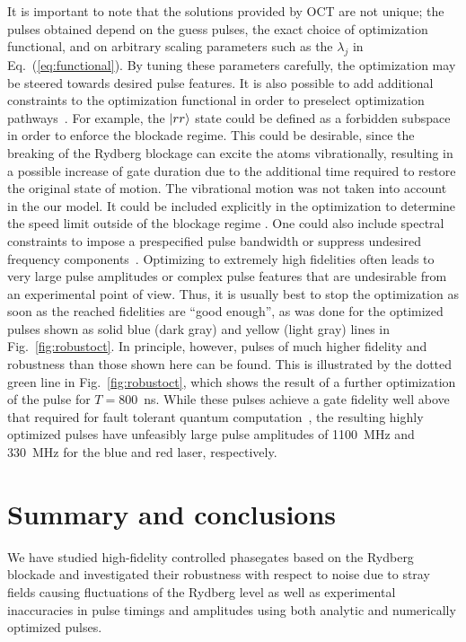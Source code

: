 It is important to note that the solutions provided by OCT are not unique; the
pulses obtained depend on the guess pulses, the exact choice of optimization
functional, and on arbitrary scaling parameters such as the $\lambda_j$ in
Eq.~(\ref{eq:functional}). By tuning these parameters carefully, the
optimization may be steered towards desired pulse features.
It is also possible to add additional constraints to the
optimization functional in order to preselect optimization
pathways~\cite{JosePRA13}. For example, the $\Ket{rr}$ state could
be defined as a forbidden subspace in order to enforce the blockade regime. This
could be desirable, since the breaking of the Rydberg blockage can excite the
atoms vibrationally, resulting in a possible increase of gate duration due to the
additional time required to restore the original state of motion. The
vibrational motion was not taken into account in the our model. It could be
included explicitly in the optimization to determine the speed limit outside of
the blockage regime \cite{GoerzJPB11}.
One could also include spectral
constraints to impose a prespecified pulse bandwidth or suppress
undesired frequency components~\cite{JosePRA13,ReichKochJMO13}.
Optimizing to extremely high fidelities often leads to very large
pulse amplitudes or complex pulse features that are undesirable from an
experimental point of view. Thus, it is usually best to stop the optimization as
soon as the reached fidelities are ``good enough'', as was done for the
optimized pulses shown as solid blue (dark gray) and yellow (light gray) lines in
Fig.~\ref{fig:robustoct}.
In principle, however, pulses of much higher fidelity
and robustness than those shown here can be found.  This is illustrated by the
dotted green line in Fig.~\ref{fig:robustoct}, which shows the result of
a further optimization of the pulse for $T=800$~ns.
While these pulses achieve a
gate fidelity well above that required for fault tolerant
quantum computation~\cite{gottesman2013overhead,reichardt2009error,aliferis2008err},
the resulting highly optimized pulses
have unfeasibly large pulse amplitudes of 1100~MHz and 330~MHz for the blue
and red laser, respectively.

\section{Summary and conclusions}
\label{sec:concl}

We have studied  high-fidelity controlled
phasegates based on the Rydberg blockade and investigated their robustness
with respect to noise due to stray fields causing fluctuations of the
Rydberg level as well as experimental inaccuracies in pulse timings and
amplitudes using both analytic and numerically optimized pulses.

